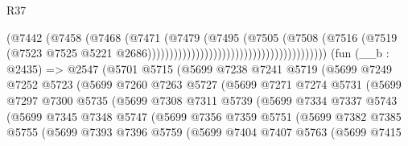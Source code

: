 \begin{lexlean}{R37}
\begin{coremodule}
                                                                (@7442
                                                                  (@7458
                                                                    (@7468
                                                                      (@7471
                                                                        (@7479
                                                                          (@7495
                                                                            (@7505
                                                                              (@7508
                                                                                (@7516
                                                                                  (@7519
                                                                                    (@7523
                                                                                      @7525
                                                                                      @5221
                                                                                      @2686)))))))))))))))))))))))))))))))))))))))))
    (fun (__b : @2435) =>
    @2547
      (@5701
        @5715
        (@5699
          @7238
          @7241
          @5719
          (@5699
            @7249
            @7252
            @5723
            (@5699
              @7260
              @7263
              @5727
              (@5699
                @7271
                @7274
                @5731
                (@5699
                  @7297
                  @7300
                  @5735
                  (@5699
                    @7308
                    @7311
                    @5739
                    (@5699
                      @7334
                      @7337
                      @5743
                      (@5699
                        @7345
                        @7348
                        @5747
                        (@5699
                          @7356
                          @7359
                          @5751
                          (@5699
                            @7382
                            @7385
                            @5755
                            (@5699
                              @7393
                              @7396
                              @5759
                              (@5699
                                @7404
                                @7407
                                @5763
                                (@5699
                                  @7415

\end{coremodule}
\end{lexlean}
